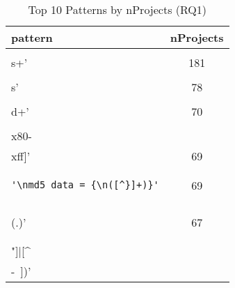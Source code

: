 \begin{table*}
\begin{center}
\caption{Top 10 Patterns by nProjects (RQ1)}
\label{table:topNW}
\begin{tabular}{lc}
\toprule
pattern & nProjects \\ 
\midrule
\begin{minipage}{2.3in}
\begin{verbatim}
'\\s+'\end{verbatim}
\end{minipage}
& 181 \\ 
\midrule
\begin{minipage}{2.3in}
\begin{verbatim}
'\\s'\end{verbatim}
\end{minipage}
& 78 \\ 
\midrule
\begin{minipage}{2.3in}
\begin{verbatim}
'\\d+'\end{verbatim}
\end{minipage}
& 70 \\ 
\midrule
\begin{minipage}{2.3in}
\begin{verbatim}
'[\\x80-\\xff]'\end{verbatim}
\end{minipage}
& 69 \\ 
\midrule
\begin{minipage}{2.3in}
\begin{verbatim}
'\nmd5_data = {\n([^}]+)}'\end{verbatim}
\end{minipage}
& 69 \\ 
\midrule
\begin{minipage}{2.3in}
\begin{verbatim}
'\\\\(.)'\end{verbatim}
\end{minipage}
& 67 \\ 
\midrule
\begin{minipage}{2.3in}
\begin{verbatim}
'([\\\\"]|[^\\ -~])'\end{verbatim}

\end{minipage}
\end{tabular}
\end{center}
\end{table*}
